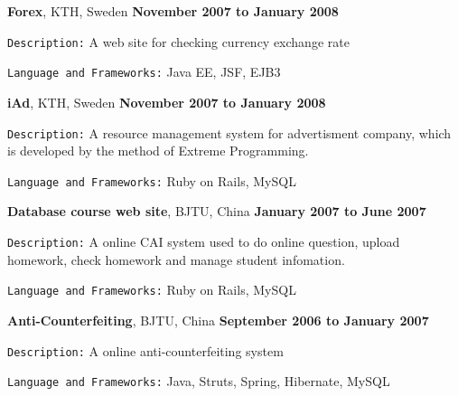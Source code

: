 \blankline

\textbf{Forex}, KTH, Sweden \hfill \textbf{November 2007 to January 2008}
\begin{outerlist}
\item \texttt{Description:}
A web site for checking currency exchange rate
\item \texttt{Language and Frameworks:}
Java EE, JSF, EJB3
\end{outerlist}

\blankline

\textbf{iAd}, KTH, Sweden \hfill \textbf{November 2007 to January 2008}
\begin{outerlist}
\item \texttt{Description:}
A resource management system for advertisment company, which is developed by the method of Extreme Programming.
\item \texttt{Language and Frameworks:}
Ruby on Rails, MySQL
\end{outerlist}

\blankline

\textbf{Database course web site}, BJTU, China \hfill \textbf{January 2007 to June 2007}
\begin{outerlist}
\item \texttt{Description:}
A online CAI system used to do online question, upload homework, check homework and manage student infomation.
\item \texttt{Language and Frameworks:}
Ruby on Rails, MySQL
\end{outerlist}

\blankline

\textbf{Anti-Counterfeiting}, BJTU, China \hfill \textbf{September 2006 to January 2007}
\begin{outerlist}
\item \texttt{Description:}
A online anti-counterfeiting system
\item \texttt{Language and Frameworks:}
Java, Struts, Spring, Hibernate, MySQL
\end{outerlist}
